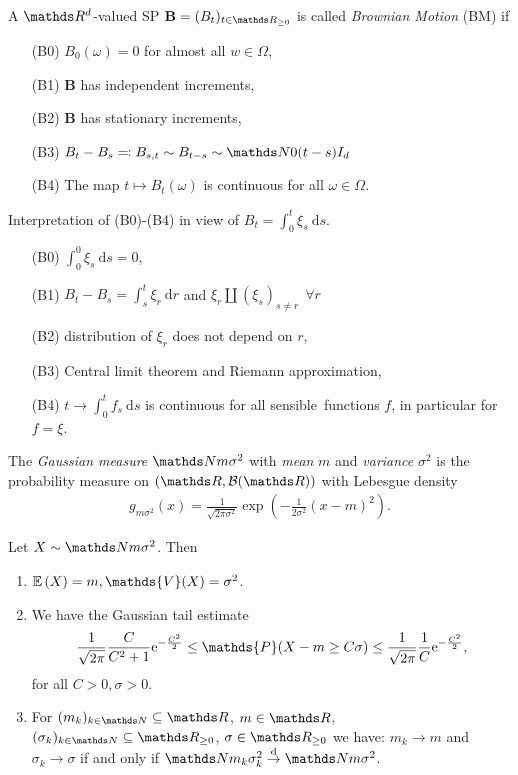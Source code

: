 \begin{defi}
A $\Rd$-valued SP $\textbf{B}=(B_t)_{t \in \R_{\geq 0}}$ is called \emph{Brownian Motion} (BM) if 
\begin{enumerate}
\item[(B0)] $B_0(\omega)=0$ for almost all $w\in \Omega$,
\item[(B1)] $\textbf{B}$ has independent increments,
\item[(B2)] $\textbf{B}$ has stationary increments,
\item[(B3)] $B_t-B_s\eqqcolon B_{s,t}\sim B_{t-s}\sim \N{0}{(t-s)I_d}$
\item[(B4)] The map $t\mapsto B_t(\omega)$ is continuous for all $\omega \in \Omega$.
\end{enumerate}
\end{defi}

\begin{bem}
Interpretation of (B0)-(B4) in view of $B_t=\int_0^t \xi_s~\mathrm{d}s$.
\begin{enumerate}
\item[(B0)] $\int_0^0\xi_s~\mathrm{d}s=0$,
\item[(B1)] $B_t-B_s=\int_s^t \xi_r~\mathrm{d}r$ and $\xi_r \amalg (\xi_s)_{s\not =r}~~\forall r$
\item[(B2)] distribution of $\xi_r$ does not depend on $r$,
\item[(B3)] Central limit theorem and Riemann approximation,
\item[(B4)] $t\to \int_0^t f_s~\mathrm{d}s$ is continuous for all \glqq sensible\grqq\, functions $f$, in particular for $f=\xi$.
\end{enumerate}
\end{bem}

\begin{defi}
The \emph{Gaussian measure} $\N{m}{\sigma^2}$ with \emph{mean} $m$ and \emph{variance} $\sigma^2$ is the probability measure on
$(\R,\mathcal{B}(\R))$ with Lebesgue density
\begin{align*}
g_{m\sigma^2}(x)=\frac{1}{\sqrt{2\pi \sigma^2}} \exp\left(-\frac{1}{2\sigma^2}(x-m)^2\right).
\end{align*}
\end{defi}

\begin{prop}
Let $X\sim \N{m}{\sigma^2}$. Then
\begin{enumerate}[label=(\alph*)]
\item $\E{X}=m, \mathds{V}(X)=\sigma^2$.
\item We have the \glqq Gaussian tail estimate\grqq
\begin{align*}
\frac{1}{\sqrt{2\pi}} \frac{C}{C^2+1}\e^{-\frac{C^2}{2}}\leq \mathds{P}(X-m\geq C \sigma)\leq \frac{1}{\sqrt{2\pi}} \frac{1}{C}\e^{-\frac{C^2}{2}},
\end{align*}
for all $C>0,\sigma>0$.
\item For $(m_k)_{k\in \N}\subseteq \R$, $m\in \R$, $(\sigma_k)_{k\in \N}\subseteq \R_{\geq 0}$, $\sigma\in \R_{\geq 0}$ we have:
$m_k\to m$ and $\sigma_k\to \sigma$ if and only if $\N{m_k}{\sigma_k^2}\overset{\text{d}}{\to} \N{m}{\sigma^2}$.
\end{enumerate}
\end{prop}

